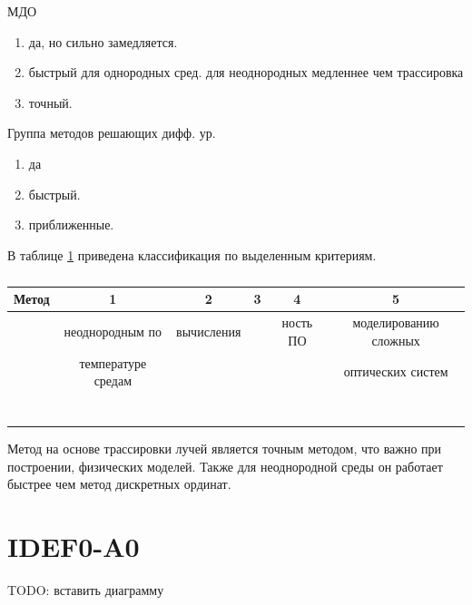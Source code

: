 МДО

\begin{enumerate}
	\item да, но сильно замедляется. 
	\item быстрый для однородных сред. для неоднородных медленнее чем трассировка
	\item точный. 
\end{enumerate}

Группа методов решающих дифф. ур.

\begin{enumerate}
	\item да 
	\item быстрый.
	\item приближенные. 
\end{enumerate}

В таблице \ref{tbl:class} приведена классификация по выделенным критериям.

\captionsetup{justification=raggedright, singlelinecheck=false}

\begin{table}[H]
	\begin{threeparttable}
	\caption{\label{tbl:class}}
		\begin{tabular}{|c|c|c|c|c|c|}
			\hline
			Метод&1&2&3&4&5\\\hline
			&неоднородным по &вычисления&&ность ПО&моделированию сложных \\\hline
			&температуре средам&&&&оптических систем\\\hline
			&&&&&\\\hline
			&&&&&\\\hline
			&&&&&\\\hline
			&&&&&\\\hline
			&&&&&\\\hline
			&&&&&\\\hline
			&&&&&\\\hline
\end{tabular}
\end{threeparttable}
\end{table}

Метод на основе трассировки лучей является точным методом, что важно при построении, физических моделей. Также для неоднородной среды он работает быстрее чем метод дискретных ординат.

\section{IDEF0-A0}

TODO: вставить диаграмму